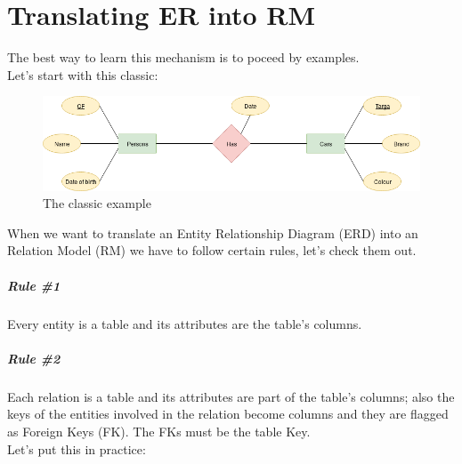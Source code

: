 \documentclass[class=book, crop=false, oneside]{standalone}
\begin{document}
\chapter*{Translating ER into RM}
The best way to learn this mechanism is to poceed by examples.\\
Let's start with this classic:

\begin{figure}[H]
	\centering
	\includegraphics[width=.9\textwidth,keepaspectratio]{diagram1_00.png}
	\caption{The classic example}
	\label{diagram1.00}
\end{figure}

When we want to translate an Entity Relationship Diagram (ERD) into an Relation Model (RM) we have to follow certain rules, let's check them out.
\paragraph*{Rule \#1} Every entity is a table and its attributes are the table's columns.
\paragraph*{Rule \#2} Each relation is a table and its attributes are part of the table's columns; also the keys of the entities involved in the relation become columns and they are flagged as Foreign Keys (FK). The FKs must be the table Key.\\

Let's put this in practice:
\vskip 20pt
\end{document}
